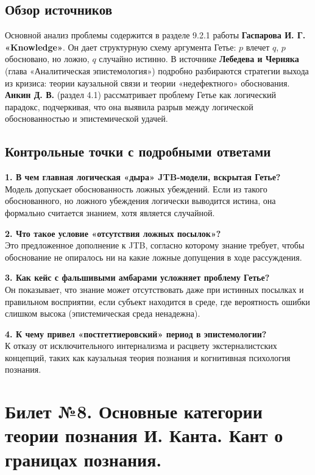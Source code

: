 \documentclass[a4paper,12pt]{article}
\begin{document}
\subsection{Обзор источников}

Основной анализ проблемы содержится в разделе 9.2.1 работы \textbf{Гаспарова И. Г. «Knowledge»}. Он дает структурную схему аргумента Гетье: $p$ влечет $q$, $p$ обосновано, но ложно, $q$ случайно истинно. В источнике \textbf{Лебедева и Черняка} (глава «Аналитическая эпистемология») подробно разбираются стратегии выхода из кризиса: теории каузальной связи и теории «недефектного» обоснования. \textbf{Анкин Д. В.} (раздел 4.1) рассматривает проблему Гетье как логический парадокс, подчеркивая, что она выявила разрыв между логической обоснованностью и эпистемической удачей.

\subsection{Контрольные точки с подробными ответами}

\textbf{1. В чем главная логическая «дыра» JTB-модели, вскрытая Гетье?}\\
Модель допускает обоснованность ложных убеждений. Если из такого обоснованного, но ложного убеждения логически выводится истина, она формально считается знанием, хотя является случайной.

\textbf{2. Что такое условие «отсутствия ложных посылок»?}\\
Это предложенное дополнение к JTB, согласно которому знание требует, чтобы обоснование не опиралось ни на какие ложные допущения в ходе рассуждения.

\textbf{3. Как кейс с фальшивыми амбарами усложняет проблему Гетье?}\\
Он показывает, что знание может отсутствовать даже при истинных посылках и правильном восприятии, если субъект находится в среде, где вероятность ошибки слишком высока (эпистемическая среда ненадежна).

\textbf{4. К чему привел «постгеттиеровский» период в эпистемологии?}\\
К отказу от исключительного интернализма и расцвету экстерналистских концепций, таких как каузальная теория познания и когнитивная психология познания.


\newpage
\section{Билет №8. Основные категории теории познания И. Канта. Кант о границах познания.}
\end{document}
